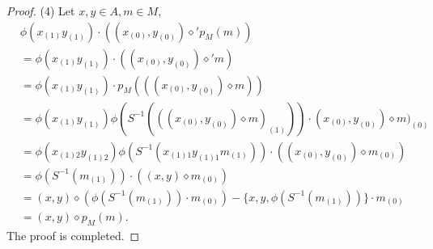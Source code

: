 \documentclass[10pt,a4paper]{amsart}
\def\di{\diamond}
\begin{document}
\begin{proof}
(4) Let $x,y\in A,m\in M$,
\begin{align*}
&\phi(x_{(1)}y_{(1)})\cdot ((x_{(0)},y_{(0)})\di'p_M(m))\\
&=\phi(x_{(1)}y_{(1)})\cdot ((x_{(0)},y_{(0)})\di'm)\\
&=\phi(x_{(1)}y_{(1)})\cdot p_M(((x_{(0)},y_{(0)})\di m))\\
&=\phi(x_{(1)}y_{(1)})\phi(S^{-1}(((x_{(0)},y_{(0)})\di m)_{(1)}))\cdot (x_{(0)},y_{(0)})\di m)_{(0)}\\
&=\phi(x_{(1)2}y_{(1)2})\phi(S^{-1}(x_{(1)1}y_{(1)1}m_{(1)}))\cdot ((x_{(0)},y_{(0)})\di m_{(0)})\\
&=\phi(S^{-1}(m_{(1)}))\cdot ((x,y)\di m_{(0)})\\
&=(x,y)\di(\phi(S^{-1}(m_{(1)}))\cdot m_{(0)})-\{x,y,\phi(S^{-1}(m_{(1)}))\}\cdot m_{(0)}\\
&=(x,y)\di p_M(m).
\end{align*}
The proof is completed.
\end{proof}
\end{document}
